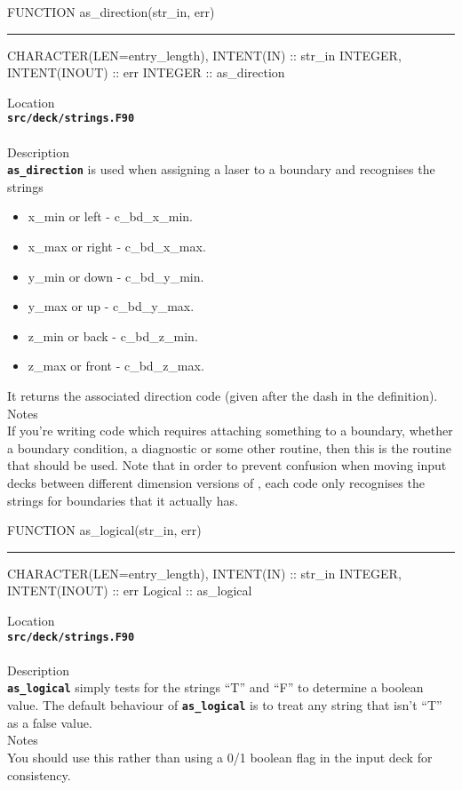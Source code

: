 \documentclass[12pt,a4paper]{article}
\newcommand{\HRule}{\rule[0.3cm]{\linewidth}{0.5mm}}
\newcommand{\inlinecode}[1]{{\color{warwickred} \bf\texttt{#1}}}
\newcommand{\EPOCH}{{\color{warwickdark}\fontfamily{phv}\selectfont{EPOCH}}}
\begin{document}
\pagebreak
\begin{codedef}
FUNCTION as_direction(str_in, err)
\HRule
CHARACTER(LEN=entry_length), INTENT(IN) :: str_in
INTEGER, INTENT(INOUT) :: err
INTEGER :: as_direction
\end{codedef}
\vspace{1cm}
{\Large Location\\}
\inlinecode{src/deck/strings.F90}\\
\\[0.5cm]
{\Large Description\\}
\inlinecode{as\_direction} is used when assigning a laser to a boundary and
recognises the strings
\begin{itemize}
\item x\_min or left - c\_bd\_x\_min.
\item x\_max or right - c\_bd\_x\_max.
\item y\_min or down - c\_bd\_y\_min.
\item y\_max or up - c\_bd\_y\_max.
\item z\_min or back - c\_bd\_z\_min.
\item z\_max or front - c\_bd\_z\_max.
\end{itemize}
It returns the associated direction code (given after the dash in the
definition).
\\[0.5cm]
{\Large Notes\\}
If you're writing code which requires attaching something to a boundary,
whether a boundary condition, a diagnostic or some other routine, then this is
the routine that should be used. Note that in order to prevent confusion when
moving input decks between different dimension versions of {\EPOCH}, each code
only recognises the strings for boundaries that it actually has.

\pagebreak
\begin{codedef}
FUNCTION as_logical(str_in, err)
\HRule
CHARACTER(LEN=entry_length), INTENT(IN) :: str_in
INTEGER, INTENT(INOUT) :: err
Logical :: as_logical
\end{codedef}
\vspace{1cm}
{\Large Location\\}
\inlinecode{src/deck/strings.F90}\\
\\[0.5cm]
{\Large Description\\}
\inlinecode{as\_logical} simply tests for the strings ``T'' and ``F'' to
determine a boolean value. The default behaviour of \inlinecode{as\_logical} is
to treat any string that isn't ``T'' as a false value.
\\[0.5cm]
{\Large Notes\\}
You should use this rather than using a 0/1 boolean flag in the input deck for
consistency.
\end{document}
